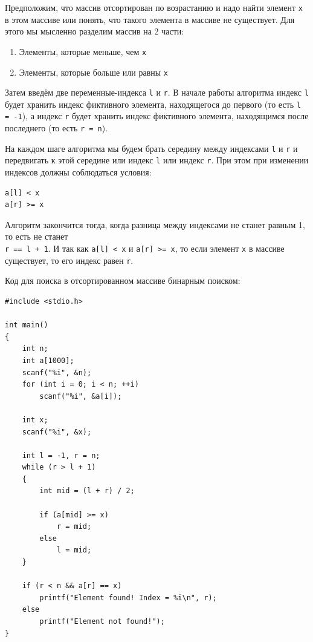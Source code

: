 \documentclass[10pt]{article}
\begin{document}
Предположим, что массив отсортирован по возрастанию и надо найти элемент \texttt{x} в этом массиве или понять, что такого элемента в массиве не существует. Для этого мы мысленно разделим массив на  2 части:
\begin{enumerate}
\item Элементы, которые меньше, чем \texttt{x}
\item Элементы, которые больше или равны \texttt{x}
\end{enumerate}

Затем введём две переменные-индекса \texttt{l} и \texttt{r}. В начале работы алгоритма индекс \texttt{l} будет хранить индекс фиктивного элемента, находящегося до первого (то есть \texttt{l = -1}), а индекс \texttt{r} будет хранить индекс фиктивного элемента, находящимся после последнего (то есть \texttt{r = n}). 

На каждом шаге алгоритма мы будем брать середину между индексами \texttt{l} и \texttt{r} и передвигать к этой середине или индекс \texttt{l} или индекс \texttt{r}. При этом при изменении индексов должны соблюдаться условия:
\begin{verbatim}
a[l] < x
a[r] >= x
\end{verbatim}

Алгоритм закончится тогда, когда разница между индексами не станет равным 1, то есть не станет \\
\texttt{r == l + 1}. И так как \texttt{a[l] < x} и \texttt{a[r] >= x}, то если элемент \texttt{x} в массиве существует, то его индекс равен \texttt{r}.



Код для поиска в отсортированном массиве бинарным поиском:
\begin{lstlisting}
#include <stdio.h>

int main() 
{
    int n;
    int a[1000];
    scanf("%i", &n);
    for (int i = 0; i < n; ++i)
        scanf("%i", &a[i]);
        
    int x;
    scanf("%i", &x);
    
    int l = -1, r = n;
    while (r > l + 1) 
    {
        int mid = (l + r) / 2;
        
        if (a[mid] >= x)
            r = mid;
        else 
            l = mid;
    }
    
    if (r < n && a[r] == x)
        printf("Element found! Index = %i\n", r);
    else
        printf("Element not found!");
}

\end{lstlisting}
\end{document}
